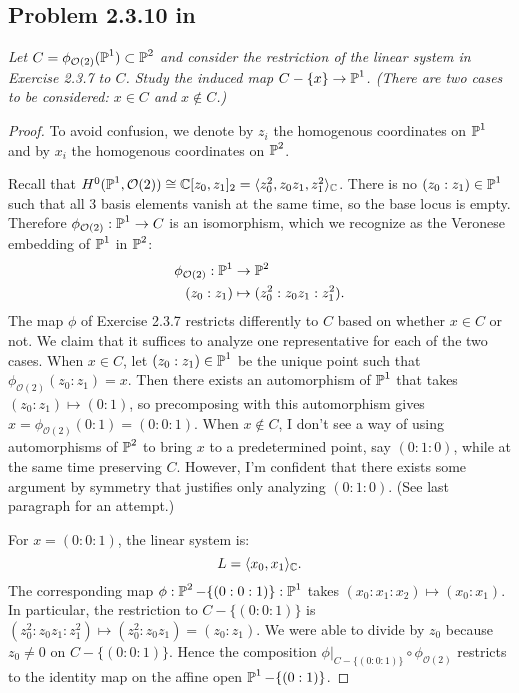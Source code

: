 \documentclass{article}
\begin{document}
\subsection*{Problem 2.3.10 in \cite{Huy}}
\emph{Let $C = \phi_{\mathcal{O}(2)}(\operatorname{\mathbb{P}}^1) \subset \operatorname{\mathbb{P}}^2$ and consider the restriction of the linear system in
Exercise 2.3.7 to $C$. Study the induced map $C - \{x\} \to \operatorname{\mathbb{P}}^1$. (There are two cases to be considered: $x \in C$
and $x \not \in C$.)}
\begin{proof}
To avoid confusion, we denote by $z_i$ the homogenous coordinates on $\operatorname{\mathbb{P}}^1$ and by $x_i$ the homogenous coordinates
on $\operatorname{\mathbb{P}}^2$.

Recall that $H^0(\operatorname{\mathbb{P}}^1, \mathcal{O}(2)) \cong \mathbb{C}[z_0, z_1]_2 = \langle z_0^2, z_0z_1, z_1^2 \rangle_{\mathbb{C}}$. There
is no $(z_0:z_1) \in \operatorname{\mathbb{P}}^1$ such that all 3 basis elements vanish at the same time, so the base locus is empty.
Therefore $\phi_{\mathcal{O}(2)} : \operatorname{\mathbb{P}}^1 \to C$ is an isomorphism, which we recognize as the Veronese embedding
of $\operatorname{\mathbb{P}}^1$ in $\operatorname{\mathbb{P}}^2$:
\begin{align*}
\phi_{\mathcal{O}(2)} : \operatorname{\mathbb{P}}^1 &\to \operatorname{\mathbb{P}}^2 \\
(z_0:z_1) &\mapsto (z_0^2:z_0z_1:z_1^2).
\end{align*}
The map $\phi$ of Exercise 2.3.7 restricts differently to $C$ based on whether $x \in C$ or not. We claim that
it suffices to analyze one representative for each of the two cases. When $x \in C$, let $(z_0:z_1) \in \operatorname{\mathbb{P}}^1$ be
the unique point such that $\phi_{\mathcal{O}(2)}(z_0:z_1) = x$. Then there exists an automorphism of $\operatorname{\mathbb{P}}^1$ that
takes $(z_0:z_1) \mapsto (0:1)$, so precomposing with this automorphism gives $x = \phi_{\mathcal{O}(2)}(0:1) =
(0:0:1)$. When $x \not \in C$, I don't see a way of using automorphisms of $\operatorname{\mathbb{P}}^2$ to bring $x$ to a predetermined
point, say $(0:1:0)$, while at the same time preserving $C$. However, I'm confident that there exists some
argument by symmetry that justifies only analyzing $(0:1:0)$. (See last paragraph for an attempt.)

For $x = (0:0:1)$, the linear system is:
\[	L = \langle x_0, x_1 \rangle_{\mathbb{C}}.	\]
The corresponding map $\phi : \operatorname{\mathbb{P}}^2 - \{(0:0:1)\} : \operatorname{\mathbb{P}}^1$ takes $(x_0 : x_1 : x_2) \mapsto (x_0:x_1)$. In particular,
the restriction to $C - \{(0:0:1)\}$ is $(z_0^2 : z_0z_1 : z_1^2) \mapsto (z_0^2:z_0z_1) = (z_0:z_1)$. We were able
to divide by $z_0$ because $z_0 \neq 0$ on $C - \{(0:0:1)\}$. Hence the composition $\phi|_{C - \{(0:0:1)\}} \circ
\phi_{\mathcal{O}(2)}$ restricts to the identity map on the affine open $\operatorname{\mathbb{P}}^1 - \{(0:1)\}$.


\end{proof}
\end{document}
